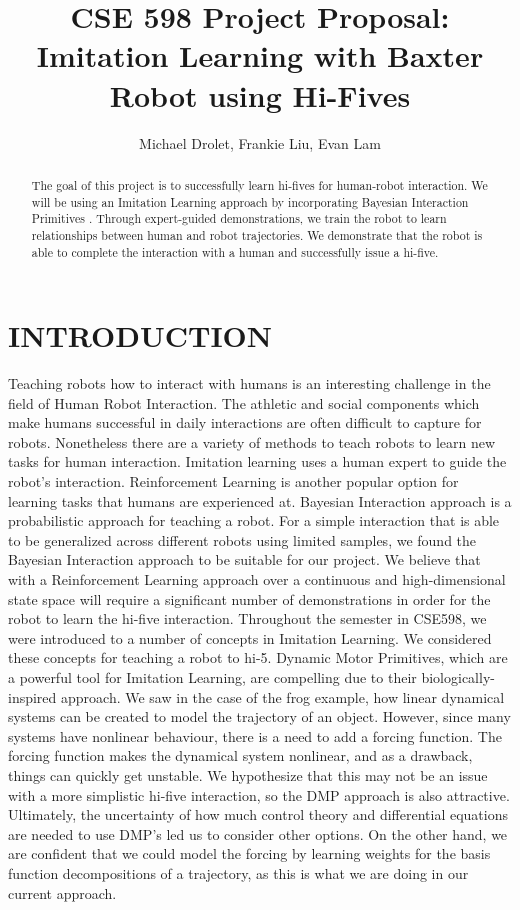 \documentclass[letterpaper, 10 pt, conference]{ieeeconf}  %
\title{\LARGE \bf
CSE 598 Project Proposal: \\
Imitation Learning with Baxter Robot using Hi-Fives
}
\author{Michael Drolet, Frankie Liu, Evan Lam}
\begin{document}
\maketitle
\thispagestyle{empty}
\pagestyle{empty}


\begin{abstract}
The goal of this project is to successfully learn hi-fives for human-robot interaction. We will be using an Imitation Learning approach by incorporating Bayesian Interaction Primitives \cite{c1}. Through expert-guided demonstrations, we train the robot to learn relationships between human and robot trajectories. We demonstrate that the robot is able to complete the interaction with a human and successfully issue a hi-five.
\end{abstract}


\section{INTRODUCTION}
Teaching robots how to interact with humans is an interesting challenge in the field of Human Robot Interaction. The athletic and social components which make humans successful in daily interactions are often difficult to capture for robots. Nonetheless there are a variety of methods to teach robots to learn new tasks for human interaction. Imitation learning uses a human expert to guide the robot's interaction. Reinforcement Learning is another popular option for learning tasks that humans are experienced at. Bayesian Interaction approach is a probabilistic approach for teaching a robot.
\newline
\indent For a simple interaction that is able to be generalized across different robots using limited samples, we found the Bayesian Interaction approach to be suitable for our project. We believe that with a Reinforcement Learning approach over a continuous and high-dimensional state space will require a significant number of demonstrations in order for the robot to learn the hi-five interaction.
\newline
\indent
Throughout the semester in CSE598, we were introduced to a number of concepts in Imitation Learning. We considered these concepts for teaching a robot to hi-5. Dynamic Motor Primitives, which are a powerful tool for Imitation Learning, are compelling due to their biologically-inspired approach. We saw in the case of the frog example, how linear dynamical systems can be created to model the trajectory of an object. However, since many systems have nonlinear behaviour, there is a need to add a forcing function. The forcing function makes the dynamical system nonlinear, and as a drawback, things can quickly get unstable. We hypothesize that this may not be an issue with a more simplistic hi-five interaction, so the DMP approach is also attractive. Ultimately, the uncertainty of how much control theory and differential equations are needed to use DMP's led us to consider other options. On the other hand, we are confident that we could model the forcing by learning weights for the basis function decompositions of a trajectory, as this is what we are doing in our current approach.
\end{document}
